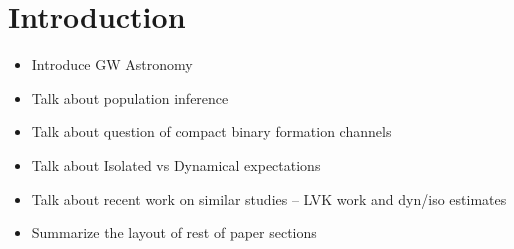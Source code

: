 \section{Introduction} \label{sec:intro}

\begin{itemize}
    \item Introduce GW Astronomy
    \item Talk about population inference
    \item Talk about question of compact binary formation channels
    \item Talk about Isolated vs Dynamical expectations
    \item Talk about recent work on similar studies -- LVK work and dyn/iso estimates
    \item Summarize the layout of rest of paper sections
\end{itemize}
